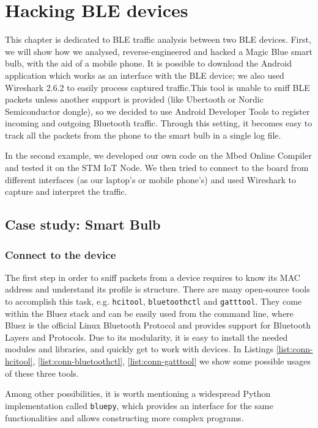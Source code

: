 \chapter{Hacking BLE devices}
\label{chapter3}
\thispagestyle{empty}

\noindent This chapter is dedicated to BLE traffic analysis between two BLE devices.
First, we will show how we analysed, reverse-engineered and hacked a Magic Blue smart bulb, with the aid of a mobile phone. It is possible to download the Android application which works as an interface with the BLE device; we also used Wireshark 2.6.2 to easily process captured traffic.This tool is unable to sniff BLE packets unless another support is provided (like Ubertooth or Nordic Semiconductor dongle), so we decided to use Android Developer Tools to register incoming and outgoing Bluetooth traffic.
Through this setting, it becomes easy to track all the packets from the phone to the smart bulb in a single log file. 

In the second example, we developed our own code on the Mbed Online Compiler and tested it on the STM IoT Node. We then tried to connect to the board from different interfaces (as our laptop's or mobile phone's) and used Wireshark to capture and interpret the traffic.

\section{Case study: Smart Bulb}
\subsection{Connect to the device}

The first step in order to sniff packets from a device requires to know its MAC address and understand its profile is structure. There are many open-source tools to accomplish this task, e.g. \texttt{hcitool}, \texttt{bluetoothctl} and \texttt{gatttool}. They come within the Bluez stack and can be easily used from the command line, where Bluez is the official Linux Bluetooth Protocol and provides support for Bluetooth Layers and Protocols. Due to its modularity, it is easy to install the needed modules and libraries, and quickly get to work with devices. In Listings \ref{list:conn-hcitool}, \ref{list:conn-bluetoothctl}, \ref{list:conn-gatttool} we show some possible usages of these three tools.

Among other possibilities, it is worth mentioning a widespread Python implementation called \texttt{bluepy}, which provides an interface for the same functionalities and allows constructing more complex programs.

